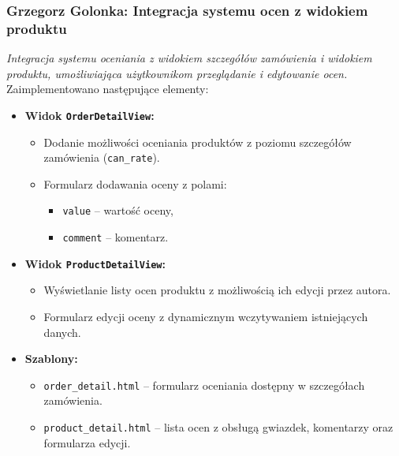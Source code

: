 \documentclass[12pt,a4paper,oneside]{article}
\theoremstyle{definition}
\numberwithin{equation}{section}
\begin{document}
\subsubsection{Grzegorz Golonka: Integracja systemu ocen z widokiem produktu}
\label{section:1.3.35}
\textit{
Integracja systemu oceniania z widokiem szczegółów zamówienia i widokiem produktu, umożliwiająca użytkownikom przeglądanie i edytowanie ocen.
}
Zaimplementowano następujące elementy:
\begin{itemize}
    \item \textbf{Widok \texttt{OrderDetailView}:}
    \begin{itemize}
        \item Dodanie możliwości oceniania produktów z poziomu szczegółów zamówienia (\texttt{can\_rate}).
        \item Formularz dodawania oceny z polami:
        \begin{itemize}
            \item \texttt{value} – wartość oceny,
            \item \texttt{comment} – komentarz.
        \end{itemize}
    \end{itemize}
    \item \textbf{Widok \texttt{ProductDetailView}:}
    \begin{itemize}
        \item Wyświetlanie listy ocen produktu z możliwością ich edycji przez autora.
        \item Formularz edycji oceny z dynamicznym wczytywaniem istniejących danych.
    \end{itemize}
    \item \textbf{Szablony:}
    \begin{itemize}
        \item \texttt{order\_detail.html} – formularz oceniania dostępny w szczegółach zamówienia.
        \item \texttt{product\_detail.html} – lista ocen z obsługą gwiazdek, komentarzy oraz formularza edycji.
    \end{itemize}
\end{itemize}
%
%
\end{document}
